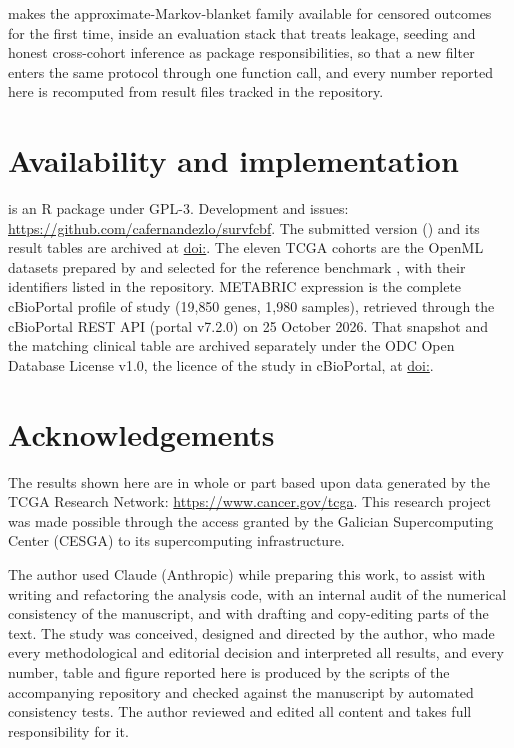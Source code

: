  makes the approximate-Markov-blanket family available for
censored outcomes for the first time, inside an evaluation stack that treats
leakage, seeding and honest cross-cohort inference as package responsibilities,
so that a new filter enters the same protocol through one function call, and every
number reported here is recomputed from result files tracked in the repository.

\section{Availability and implementation}

 is an R package under GPL-3. Development and issues:
\url{https://github.com/cafernandezlo/survfcbf}. The submitted version
(\pkgversion) and its result tables are archived at
\href{https://doi.org/\zenododoi}{doi:\zenododoi}. The eleven TCGA cohorts are
the OpenML datasets prepared by \citet{herrmann2020} and selected for the
reference benchmark \citep{bommert2021bib}, with their identifiers listed in the
repository. METABRIC expression is the complete cBioPortal
\citep{cerami2012,gao2013,debruijn2023} profile  of
study  (19{,}850 genes, 1{,}980 samples), retrieved through
the cBioPortal REST API (portal v7.2.0) on 25 October 2026. That snapshot and the
matching clinical table are archived separately under the ODC Open Database
License v1.0, the licence of the study in cBioPortal, at
\href{https://doi.org/\metabricdoi}{doi:\metabricdoi}.

\section{Acknowledgements}

The results shown here are in whole or part based upon data generated by the
TCGA Research Network: \url{https://www.cancer.gov/tcga}. This research project
was made possible through the access granted by the Galician Supercomputing
Center (CESGA) to its supercomputing infrastructure.

The author used Claude (Anthropic) while preparing this work, to assist with
writing and refactoring the analysis code, with an internal audit of the numerical
consistency of the manuscript, and with drafting and copy-editing parts of the
text. The study was conceived, designed and directed by the author, who made
every methodological and editorial decision and interpreted all results, and every
number, table and figure reported here is produced by the scripts of the
accompanying repository and checked against the manuscript by automated
consistency tests. The author reviewed and edited all content and takes full
responsibility for it.

